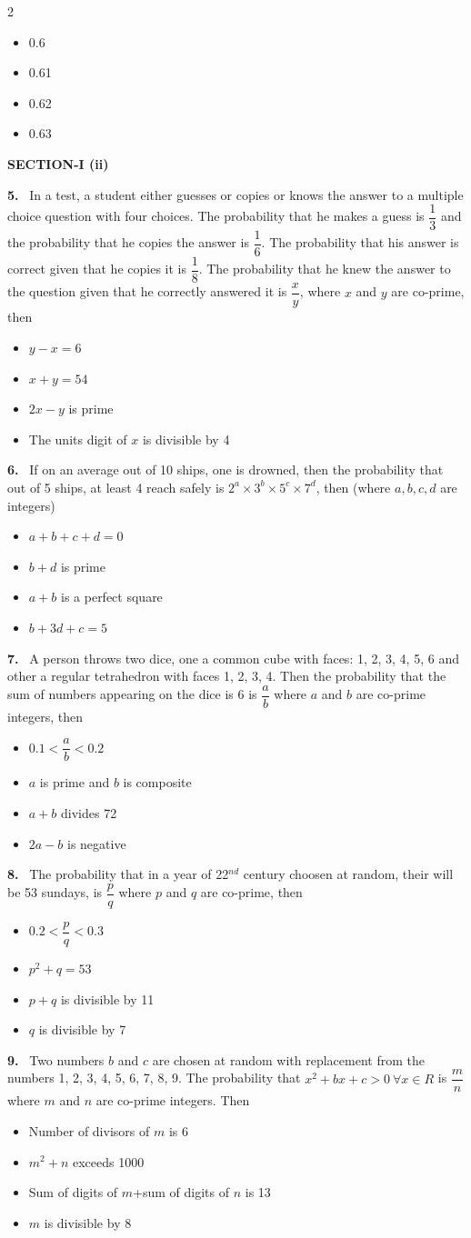 \documentclass[10pt]{extarticle}
\newcommand{\sect}[1]{\par\smallskip\noindent\textbf{#1}\par}
\newcommand{\qn}[1]{\par\smallskip\noindent\textbf{#1.}~}
\newenvironment{qoptions}{\begin{itemize}[leftmargin=1.8em,itemsep=1pt,topsep=2pt,label={}]}{\end{itemize}}
\newcommand{\opt}[2]{\item[(#1)] #2}
\begin{document}
\begin{multicols}{2}
\begin{qoptions}
\opt{A}{0.6}
\opt{B}{0.61}
\opt{C}{0.62}
\opt{D}{0.63}
\end{qoptions}
\sect{SECTION-I (ii)}
\qn{5} In a test, a student either guesses or copies or knows the answer to a multiple choice question with four choices. The probability that he makes a guess is $\dfrac13$ and the probability that he copies the answer is $\dfrac16$. The probability that his answer is correct given that he copies it is $\dfrac18$. The probability that he knew the answer to the question given that he correctly answered it is $\dfrac xy$, where $x$ and $y$ are co-prime, then
\begin{qoptions}
\opt{A}{$y-x=6$}
\opt{B}{$x+y=54$}
\opt{C}{$2x-y$ is prime}
\opt{D}{The units digit of $x$ is divisible by 4}
\end{qoptions}
\qn{6} If on an average out of 10 ships, one is drowned, then the probability that out of 5 ships, at least 4 reach safely is $2^a\times3^b\times5^c\times7^d$, then (where $a,b,c,d$ are integers)
\begin{qoptions}
\opt{A}{$a+b+c+d=0$}
\opt{B}{$b+d$ is prime}
\opt{C}{$a+b$ is a perfect square}
\opt{D}{$b+3d+c=5$}
\end{qoptions}
\qn{7} A person throws two dice, one a common cube with faces: 1, 2, 3, 4, 5, 6 and other a regular tetrahedron with faces 1, 2, 3, 4. Then the probability that the sum of numbers appearing on the dice is 6 is $\dfrac ab$ where $a$ and $b$ are co-prime integers, then
\begin{qoptions}
\opt{A}{$0.1<\dfrac ab<0.2$}
\opt{B}{$a$ is prime and $b$ is composite}
\opt{C}{$a+b$ divides 72}
\opt{D}{$2a-b$ is negative}
\end{qoptions}
\qn{8} The probability that in a year of 22$^{nd}$ century choosen at random, their will be 53 sundays, is $\dfrac pq$ where $p$ and $q$ are co-prime, then
\begin{qoptions}
\opt{A}{$0.2<\dfrac pq<0.3$}
\opt{B}{$p^2+q=53$}
\opt{C}{$p+q$ is divisible by 11}
\opt{D}{$q$ is divisible by 7}
\end{qoptions}
\qn{9} Two numbers $b$ and $c$ are chosen at random with replacement from the numbers 1, 2, 3, 4, 5, 6, 7, 8, 9. The probability that $x^2+bx+c>0\ \forall x\in R$ is $\dfrac mn$ where $m$ and $n$ are co-prime integers. Then
\begin{qoptions}
\opt{A}{Number of divisors of $m$ is 6}
\opt{B}{$m^2+n$ exceeds 1000}
\opt{C}{Sum of digits of $m$+sum of digits of $n$ is 13}
\opt{D}{$m$ is divisible by 8}

\end{qoptions}
\end{multicols}
\end{document}
